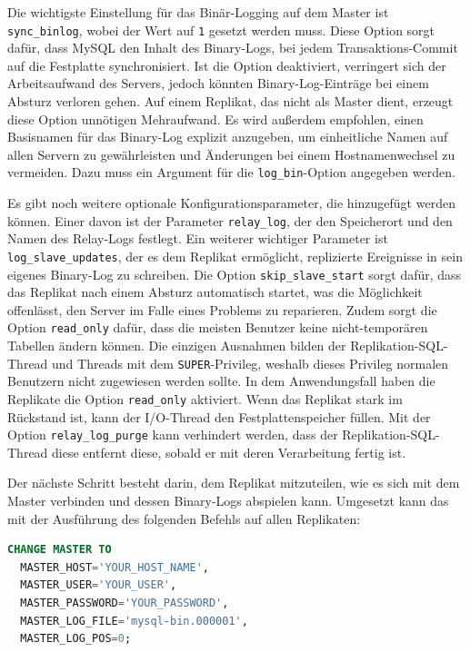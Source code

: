 Die wichtigste Einstellung für das Binär-Logging auf dem Master ist \texttt{sync\_binlog}, wobei der Wert auf \texttt{1} gesetzt werden muss.
Diese Option sorgt dafür, dass MySQL den Inhalt des Binary-Logs, bei jedem Transaktions-Commit auf die Festplatte synchronisiert.
Ist die Option deaktiviert, verringert sich der Arbeitsaufwand des Servers, jedoch könnten Binary-Log-Einträge bei einem Absturz verloren gehen.
Auf einem Replikat, das nicht als Master dient, erzeugt diese Option unnötigen Mehraufwand.
Es wird außerdem empfohlen, einen Basisnamen für das Binary-Log explizit anzugeben, um einheitliche Namen auf allen Servern zu gewährleisten und Änderungen bei einem Hostnamenwechsel zu vermeiden.
Dazu muss ein Argument für die \texttt{log\_bin}-Option angegeben werden.

Es gibt noch weitere optionale Konfigurationsparameter, die hinzugefügt werden können.
Einer davon ist der Parameter \texttt{relay\_log}, der den Speicherort und den Namen des Relay-Logs festlegt.
Ein weiterer wichtiger Parameter ist \texttt{log\_slave\_updates}, der es dem Replikat ermöglicht, replizierte Ereignisse in sein eigenes Binary-Log zu schreiben.
Die Option \texttt{skip\_slave\_start} sorgt dafür, dass das Replikat nach einem Absturz automatisch startet, was die Möglichkeit offenlässt, den Server im Falle eines Problems zu reparieren.
Zudem sorgt die Option \texttt{read\_only} dafür, dass die meisten Benutzer keine nicht-temporären Tabellen ändern können.
Die einzigen Ausnahmen bilden der Replikation-SQL-Thread und Threads mit dem \texttt{SUPER}-Privileg, weshalb dieses Privileg normalen Benutzern nicht zugewiesen werden sollte.
In dem Anwendungsfall haben die Replikate die Option \texttt{read\_only} aktiviert.
Wenn das Replikat stark im Rückstand ist, kann der I/O-Thread den Festplattenspeicher füllen.
Mit der Option \texttt{relay\_log\_purge} kann verhindert werden, dass der Replikation-SQL-Thread diese entfernt diese, sobald er mit deren Verarbeitung fertig ist.

Der nächste Schritt besteht darin, dem Replikat mitzuteilen, wie es sich mit dem Master verbinden und dessen Binary-Logs abspielen kann.
Umgesetzt kann das mit der Ausführung des folgenden Befehls auf allen Replikaten:

\vspace{-8pt}
\begin{lstlisting}[language=SQL,caption=Verbindung des Replikats zum Master,label={lst:replication-connection-replica-master}]
CHANGE MASTER TO
  MASTER_HOST='YOUR_HOST_NAME',
  MASTER_USER='YOUR_USER',
  MASTER_PASSWORD='YOUR_PASSWORD',
  MASTER_LOG_FILE='mysql-bin.000001',
  MASTER_LOG_POS=0;
\end{lstlisting}
\vspace{-5pt}

